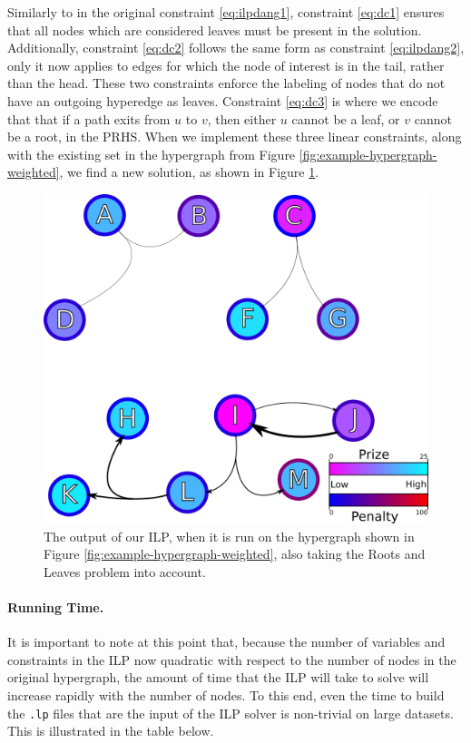 \documentclass[12pt,twoside]{reedthesis}
\theoremstyle{definition}
\begin{document}
Similarly to in the original constraint \eqref{eq:ilpdang1}, constraint \eqref{eq:dc1} ensures that all nodes which are considered leaves must be present in the solution. Additionally, constraint \eqref{eq:dc2} follows the same form as constraint \eqref{eq:ilpdang2}, only it now applies to edges for which the node of interest is in the tail, rather than the head. These two constraints enforce the labeling of nodes that do not have an outgoing hyperedge as leaves. Constraint \eqref{eq:dc3} is where we encode that that if a path exits from $u$ to $v$, then either $u$ cannot be a leaf, or $v$ cannot be a root, in the PRHS. When we implement these three linear constraints, along with the existing set in the hypergraph from Figure \ref{fig:example-hypergraph-weighted}, we find a new solution, as shown in Figure \ref{fig:example-hypergraph-weighted_DC}.

\begin{figure}[hp]
  \begin{center}
    \includegraphics{example-hypergraph-weighted_DC}
  \caption[Output from ILP after Roots and Leaves.]{The output of our ILP, when it is run on the hypergraph shown in Figure \ref{fig:example-hypergraph-weighted}, also taking the Roots and Leaves problem into account.}
  \label{fig:example-hypergraph-weighted_DC}
  \end{center}
\end{figure}

\paragraph{Running Time.}It is important to note at this point that, because the number of variables and constraints in the ILP now quadratic with respect to the number of nodes in the original hypergraph, the amount of time that the ILP will take to solve will increase rapidly with the number of nodes. To this end, even the time to build the \texttt{.lp} files that are the input of the ILP solver is non-trivial on large datasets. This is illustrated in the table below.
\end{document}
